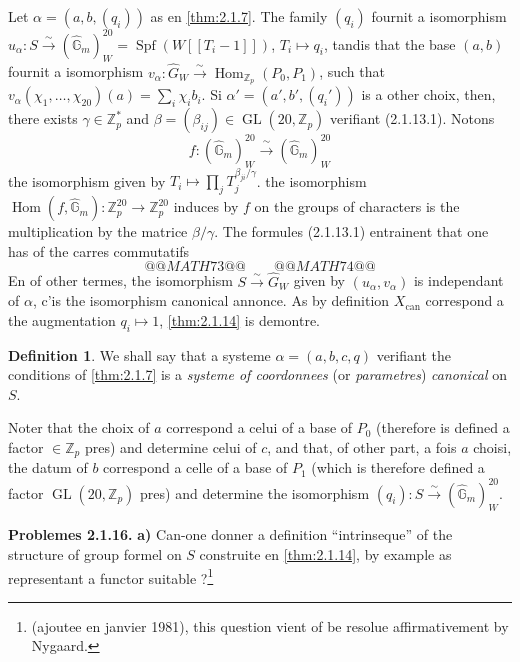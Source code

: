 \documentclass[12pt,a4paper]{article}
\theoremstyle{plain}
\theoremstyle{definition}
\newtheorem{definition}[theorem]{Definition}
\theoremstyle{remark}
\DeclareMathOperator{\Spf}{Spf}
\DeclareMathOperator{\Hom}{Hom}
\DeclareMathOperator{\GL}{GL}
\begin{document}
Let $\alpha = (a, b, (q_i))$ as en \ref{thm:2.1.7}. The family $(q_i)$ fournit a isomorphism $u_\alpha : S \xrightarrow{\sim} (\widehat{\mathbb{G}}_m)_W^{20} = \Spf(W[[T_i - 1]])$, $T_i \mapsto q_i$, tandis that the base $(a, b)$ fournit a isomorphism $v_\alpha : \widehat{G}_W \xrightarrow{\sim} \Hom_{\mathbb{Z}_p}(P_0, P_1)$, such that $v_\alpha(\chi_1, \ldots, \chi_{20})(a) = \sum_i \chi_i b_i$. Si $\alpha' = (a', b', (q_i'))$ is a other choix, then, there exists $\gamma \in \mathbb{Z}_p^*$ and $\beta = (\beta_{ij}) \in \GL(20, \mathbb{Z}_p)$ verifiant (2.1.13.1). Notons
\[
f : (\widehat{\mathbb{G}}_m)_W^{20} \xrightarrow{\;\sim\;} (\widehat{\mathbb{G}}_m)_W^{20}
\]
the isomorphism given by $T_i \mapsto \prod_j T_j^{\beta_{ji}/\gamma}$. the isomorphism $\Hom(f, \widehat{\mathbb{G}}_m) : \mathbb{Z}_p^{20} \to \mathbb{Z}_p^{20}$ induces by $f$ on the groups of characters is the multiplication by the matrice $\beta/\gamma$. The formules (2.1.13.1) entrainent that one has of the carres commutatifs
\[
@@MATH73@@
\qquad
@@MATH74@@
\]
En of other termes, the isomorphism $S \xrightarrow{\sim} \widehat{G}_W$ given by $(u_\alpha, v_\alpha)$ is independant of $\alpha$, c'is the isomorphism canonical annonce. As by definition $X_{\mathrm{can}}$ correspond a the augmentation $q_i \mapsto 1$, \ref{thm:2.1.14} is demontre.

\begin{definition}\label{def:2.1.15}
We shall say that a systeme $\alpha = (a, b, c, q)$ verifiant the conditions of \ref{thm:2.1.7} is a \emph{systeme of coordonnees} (or \emph{parametres}) \emph{canonical} on $S$.
\end{definition}

Noter that the choix of $a$ correspond a celui of a base of $P_0$ (therefore is defined a factor $\in \mathbb{Z}_p$ pres) and determine celui of $c$, and that, of other part, a fois $a$ choisi, the datum of $b$ correspond a celle of a base of $P_1$ (which is therefore defined a factor $\GL(20, \mathbb{Z}_p)$ pres) and determine the isomorphism $(q_i) : S \xrightarrow{\sim} (\widehat{\mathbb{G}}_m)_W^{20}$.

\textbf{Problemes 2.1.16.} \textbf{a)} Can-one donner a definition ``intrinseque'' of the structure of group formel on $S$ construite en \ref{thm:2.1.14}, by example as representant a functor suitable ?\footnote{(ajoutee en janvier 1981), this question vient of be resolue affirmativement by Nygaard.}
\end{document}
